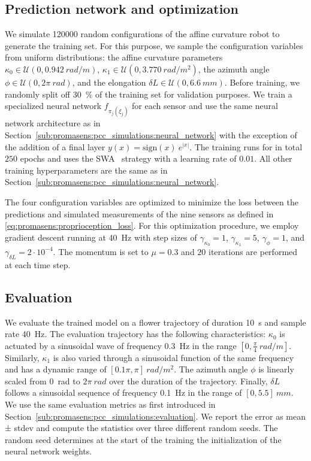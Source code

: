 \subsection{Prediction network and optimization}\label{sub:promasens:ac_simulations:network_optimization}
We simulate \SI{120000}{} random configurations of the affine curvature robot to generate the training set. For this purpose, we sample the configuration variables from uniform distributions: the affine curvature parameters $\kappa_0 \in \mathcal{U}(0, \SI{0.942}{rad \per m})$, $\kappa_1 \in \mathcal{U}(0, \SI{3.770}{rad \per m^2})$, the azimuth angle $\phi \in \mathcal{U}(0, 2 \pi \: \si{rad})$, and the elongation $\delta L \in \mathcal{U}(0, \SI{6.6}{mm})$.
Before training, we randomly split off \SI{30}{\percent} of the training set for validation purposes.
We train a specialized neural network $f_{\pi_j(\xi_j)}$ for each sensor and use the same neural network architecture as in Section~\ref{sub:promasens:pcc_simulations:neural_network} with the exception of the addition of a final layer $y(x) = \mathrm{sign}(x) \: e^{|x|}$. 
The training runs for in total $250$ epochs and uses the SWA~\cite{izmailov2018averaging} strategy with a learning rate of $0.01$. 
All other training hyperparameters are the same as in Section~\ref{sub:promasens:pcc_simulations:neural_network}.

The four configuration variables are optimized to minimize the loss between the predictions and simulated measurements of the nine sensors as defined in \ref{eq:promasens:proprioception_loss}.
For this optimization procedure, we employ gradient descent running at \SI{40}{Hz} with step sizes of $\gamma_{\kappa_0} = 1$, $\gamma_{\kappa_1} = 5$, $\gamma_{\phi} = 1$, and $\gamma_{\delta L} = 2 \cdot 10^{-4}$. The momentum is set to $\mu = 0.3$ and $20$ iterations are performed at each time step.

\subsection{Evaluation}\label{sub:promasens:ac_simulations:evaluation}
We evaluate the trained model on a flower trajectory of duration \SI{10}{s} and sample rate \SI{40}{Hz}. The evaluation trajectory has the following characteristics: $\kappa_0$ is actuated by a sinusoidal wave of frequency \SI{0.3}{Hz} in the range $[0, \frac{\pi}{4} \: \si{rad \per m}]$. Similarly, $\kappa_1$ is also varied through a sinusoidal function of the same frequency and has a dynamic range of $[0.1 \pi, \pi] \: \si{rad \per m^2}$.
The azimuth angle $\phi$ is linearly scaled from \SI{0}{rad} to $2 \pi \: \si{rad}$ over the duration of the trajectory.
Finally, $\delta L$ follows a sinusoidal sequence of frequency \SI{0.1}{Hz} in the range of $[0, 5.5] \: \si{mm}$.
We use the same evaluation metrics as first introduced in Section~\ref{sub:promasens:pcc_simulations:evaluation}.
We report the error as mean ± stdev and compute the statistics over three
different random seeds. The random seed determines at the start of the training the initialization of the neural network weights.

